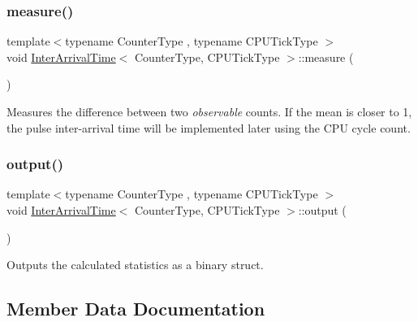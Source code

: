 \mbox{\label{classInterArrivalTime_a2da37f684151d0cfefb97b50fcffd9a0}} 
\subsubsection{\texorpdfstring{measure()}{measure()}}
{\footnotesize\ttfamily template$<$typename Counter\+Type , typename C\+P\+U\+Tick\+Type $>$ \\
void \hyperlink{classInterArrivalTime}{Inter\+Arrival\+Time}$<$ Counter\+Type, C\+P\+U\+Tick\+Type $>$\+::measure (\begin{DoxyParamCaption}{ }\end{DoxyParamCaption})\hspace{0.3cm}{\ttfamily [inline]}}



Measures the difference between two {\itshape observable} counts. If the mean is closer to 1, the pulse inter-\/arrival time will be implemented later using the C\+PU cycle count. 

\mbox{\label{classInterArrivalTime_a8a12081f1132d4a2c7a3898b01897c8d}} 
\subsubsection{\texorpdfstring{output()}{output()}}
{\footnotesize\ttfamily template$<$typename Counter\+Type , typename C\+P\+U\+Tick\+Type $>$ \\
void \hyperlink{classInterArrivalTime}{Inter\+Arrival\+Time}$<$ Counter\+Type, C\+P\+U\+Tick\+Type $>$\+::output (\begin{DoxyParamCaption}{ }\end{DoxyParamCaption})\hspace{0.3cm}{\ttfamily [inline]}}



Outputs the calculated statistics as a binary struct. 



\subsection{Member Data Documentation}
\mbox{\label{classInterArrivalTime_a6873d0052064c8db918fd0a813524c6f}} 
